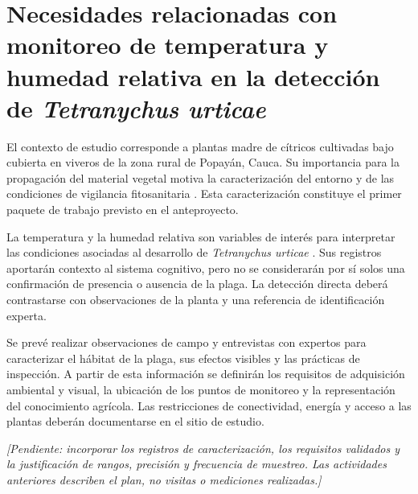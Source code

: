 \chapter{Necesidades relacionadas con monitoreo de temperatura y humedad relativa
en la detección de \textit{Tetranychus urticae}}
\label{cap:necesidades-monitoreo}

El contexto de estudio corresponde a plantas madre de cítricos cultivadas bajo
cubierta en viveros de la zona rural de Popayán, Cauca. Su importancia para la
propagación del material vegetal motiva la caracterización del entorno y de las
condiciones de vigilancia fitosanitaria \cite{ica2019resolucion}. Esta
caracterización constituye el primer paquete de trabajo previsto en el anteproyecto.

La temperatura y la humedad relativa son variables de interés para interpretar
las condiciones asociadas al desarrollo de \textit{Tetranychus urticae}
\cite{praslicka2004}. Sus registros aportarán contexto al sistema cognitivo, pero
no se considerarán por sí solos una confirmación de presencia o ausencia de la
plaga. La detección directa deberá contrastarse con observaciones de la planta y
una referencia de identificación experta.

Se prevé realizar observaciones de campo y entrevistas con expertos para
caracterizar el hábitat de la plaga, sus efectos visibles y las prácticas de
inspección. A partir de esta información se definirán los requisitos de
adquisición ambiental y visual, la ubicación de los puntos de monitoreo y la
representación del conocimiento agrícola. Las restricciones de conectividad,
energía y acceso a las plantas deberán documentarse en el sitio de estudio.

\textit{[Pendiente: incorporar los registros de caracterización, los requisitos
validados y la justificación de rangos, precisión y frecuencia de muestreo.
Las actividades anteriores describen el plan, no visitas o mediciones realizadas.]}
